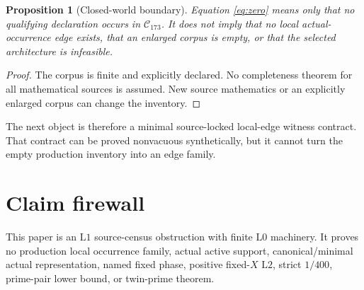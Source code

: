 \documentclass[11pt]{article}
\newtheorem{proposition}[theorem]{Proposition}
\newcommand{\Lzero}{\mathrm{L0}}
\newcommand{\Lone}{\mathrm{L1}}
\newcommand{\Ltwo}{\mathrm{L2}}
\begin{document}
\begin{proposition}[Closed-world boundary]\label{prop:scope}
Equation \eqref{eq:zero} means only that no qualifying declaration occurs
in \(\mathcal C_{173}\).  It does not imply that no local actual-occurrence
edge exists, that an enlarged corpus is empty, or that the selected
architecture is infeasible.
\end{proposition}

\begin{proof}
The corpus is finite and explicitly declared.  No completeness theorem for
all mathematical sources is assumed.  New source mathematics or an
explicitly enlarged corpus can change the inventory.
\end{proof}

The next object is therefore a minimal source-locked local-edge witness
contract.  That contract can be proved nonvacuous synthetically, but it
cannot turn the empty production inventory into an edge family.

\section{Claim firewall}

This paper is an \(\Lone\) source-census obstruction with finite
\(\Lzero\) machinery.  It proves no production local occurrence family,
actual active support, canonical/minimal actual representation, named fixed
phase, positive fixed-\(X\) \(\Ltwo\), strict \(1/400\), prime-pair lower
bound, or twin-prime theorem.



\end{document}
